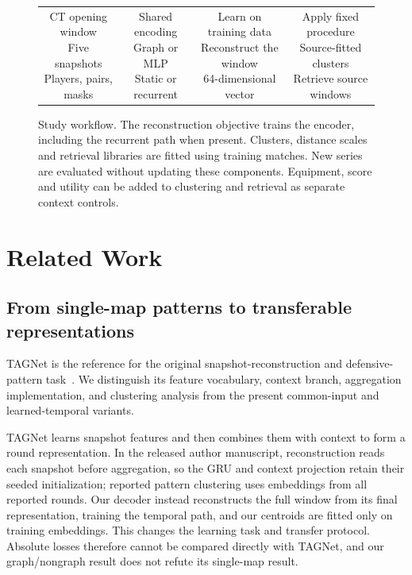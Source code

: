 \begin{figure}[t]
\centering
\begin{tabular}{c@{$\;\longrightarrow\;$}c@{$\;\longrightarrow\;$}c@{$\;\longrightarrow\;$}c}
\fbox{\parbox[c][1.5cm][c]{.19\textwidth}{\centering\small CT opening window\\Five snapshots\\Players, pairs, masks}} &
\fbox{\parbox[c][1.5cm][c]{.19\textwidth}{\centering\small Shared encoding\\Graph or MLP\\Static or recurrent}} &
\fbox{\parbox[c][1.5cm][c]{.19\textwidth}{\centering\small Learn on training data\\Reconstruct the window\\64-dimensional vector}} &
\fbox{\parbox[c][1.5cm][c]{.19\textwidth}{\centering\small Apply fixed procedure\\Source-fitted clusters\\Retrieve source windows}}
\end{tabular}
\caption{Study workflow. The reconstruction objective trains the encoder, including the recurrent path when present. Clusters, distance scales and retrieval libraries are fitted using training matches. New series are evaluated without updating these components. Equipment, score and utility can be added to clustering and retrieval as separate context controls.}
\label{fig:workflow}
\end{figure}

\section{Related Work}
\subsection{From single-map patterns to transferable representations}
TAGNet is the reference for the original snapshot-reconstruction and defensive-pattern task~\cite{tagnet2026}. We distinguish its feature vocabulary, context branch, aggregation implementation, and clustering analysis from the present common-input and learned-temporal variants.

TAGNet learns snapshot features and then combines them with context to form a round representation. In the released author manuscript, reconstruction reads each snapshot before aggregation, so the GRU and context projection retain their seeded initialization; reported pattern clustering uses embeddings from all reported rounds. Our decoder instead reconstructs the full window from its final representation, training the temporal path, and our centroids are fitted only on training embeddings. This changes the learning task and transfer protocol. Absolute losses therefore cannot be compared directly with TAGNet, and our graph/nongraph result does not refute its single-map result. %

